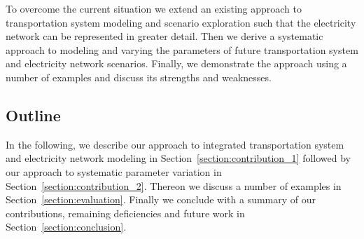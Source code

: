 To overcome the current situation we extend an existing approach to transportation system modeling and scenario exploration such that the electricity network can be represented in greater detail. Then we derive a systematic approach to modeling and varying the parameters of future transportation system and electricity network scenarios. Finally, we demonstrate the approach using a number of examples and discuss its strengths and weaknesses.



\subsection{Outline}

In the following, we describe our approach to integrated transportation system and electricity network modeling in Section~\ref{section:contribution_1} followed by our approach to systematic parameter variation in Section~\ref{section:contribution_2}. Thereon we discuss a number of examples in Section~\ref{section:evaluation}. Finally we conclude with a summary of our contributions, remaining deficiencies and future work in Section~\ref{section:conclusion}.
